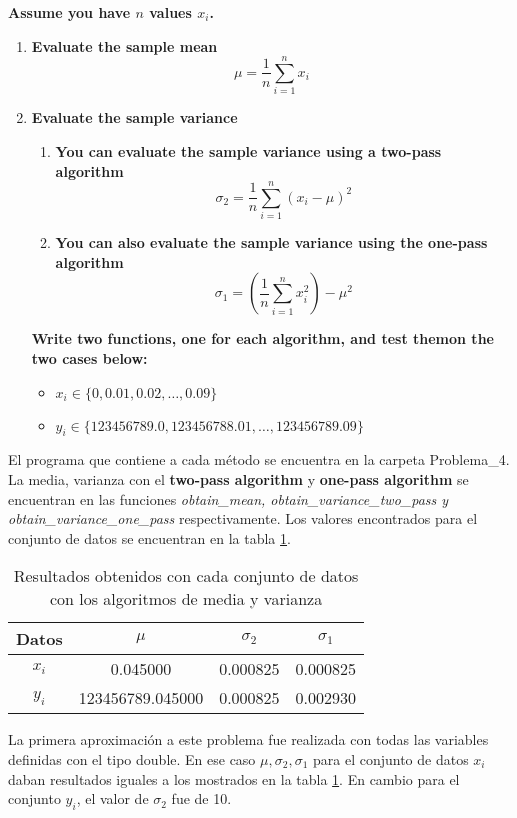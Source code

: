 \item \textbf{Assume you have $n$ values $x_i$.}
\begin{enumerate}
    \item \textbf{Evaluate the sample mean}
          \begin{equation*}
              \mu= \frac{1}{n} \sum_{i=1}^n x_i
          \end{equation*}
    \item \textbf{Evaluate the sample variance}
          \begin{enumerate}
              \item \textbf{You can evaluate the sample variance using a two-pass algorithm}
                    \begin{equation*}
                        \sigma_2 = \frac{1}{n} \sum_{i=1}^n (x_i-\mu)^2
                    \end{equation*}
              \item \textbf{You can also evaluate the sample variance using the one-pass algorithm}
                    \begin{equation*}
                        \sigma_1 = \left(\frac{1}{n} \sum_{i=1}^n x_i^2 \right) - \mu^2
                    \end{equation*}
          \end{enumerate}
          \textbf{Write two functions, one for each algorithm, and test themon the two cases below:}
          \begin{itemize}
              \item $x_i \in \{0,0.01,0.02,\dots,0.09 \}$
              \item $y_i \in \{123456789.0,123456788.01,\dots,123456789.09\}$
          \end{itemize}
\end{enumerate}

El programa que contiene a cada método se encuentra en la carpeta \textcolor{citecolor}{Problema\_4}. La media, varianza con el \textbf{two-pass algorithm} y \textbf{one-pass algorithm} se encuentran en las funciones \textit{obtain\_mean, obtain\_variance\_two\_pass y obtain\_variance\_one\_pass} respectivamente. Los valores encontrados para el conjunto de datos se encuentran en la tabla \ref{table:results4}.
\begin{table}[H]
    \centering
    \begin{tabular}{cccc} \hline
        Datos & $\mu$            & $\sigma_2$ & $\sigma_1$ \\ \hline
        $x_i$ & 0.045000         & 0.000825   & 0.000825   \\
        $y_i$ & 123456789.045000 & 0.000825   & 0.002930   \\ \hline
    \end{tabular}
    \caption{Resultados obtenidos con cada conjunto de datos con los algoritmos de media y varianza}
    \label{table:results4}
\end{table}
La primera aproximación a este problema fue realizada con todas las variables definidas con el tipo double. En ese caso $\mu,\sigma_2,  \sigma_1$ para el conjunto de datos $x_i$ daban resultados iguales a los mostrados en la tabla \ref{table:results4}. En cambio para el conjunto $y_i$, el valor de $\sigma_2$ fue de 10.

